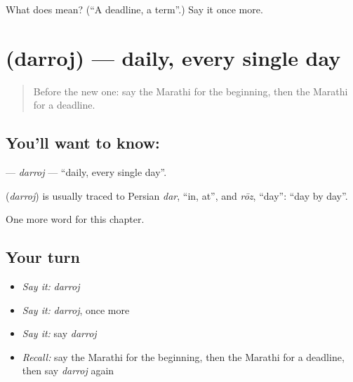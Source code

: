 \begin{tcolorbox}[breakable,colback=teal!4,colframe=teal!35!black,title={Before you move on}]
What does  mean? (\textquotedblleft{}A deadline, a term\textquotedblright{}.) Say it once more.
\end{tcolorbox}
\section[\texorpdfstring{\mr{दररोज} (darroj)}{दररोज (darroj)}]{ (darroj) — daily, every single day}

\label{lesson:MR-C230-darroj}



\begin{quote}
Before the new one: say the Marathi for the beginning, then the Marathi for a deadline.
\end{quote}

\subsection*{You'll want to know: }
\textbf{} — \emph{darroj} — \textquotedblleft{}daily, every single day\textquotedblright{}.

\begin{cousinweb}
\textbf{} (\emph{darroj}) is usually traced to Persian \emph{dar}, \textquotedblleft{}in, at\textquotedblright{}, and \emph{rōz}, \textquotedblleft{}day\textquotedblright{}: \textquotedblleft{}day by day\textquotedblright{}.
\end{cousinweb}

\begin{grammarlens}[title={What you've built}]
One more word for this chapter.
\end{grammarlens}

\subsection*{Your turn}
\begin{itemize}
\raggedright
  \item \emph{Say it:} \emph{darroj}
  \item \emph{Say it:} \emph{darroj}, once more
  \item \emph{Say it:} say \emph{darroj}
  \item \emph{Recall:} say the Marathi for the beginning, then the Marathi for a deadline, then say \emph{darroj} again
\end{itemize}

